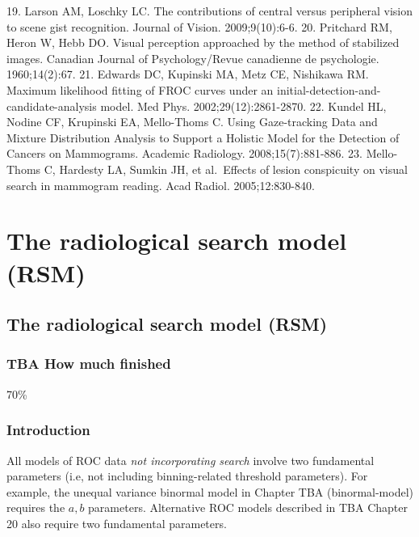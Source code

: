 \documentclass[
]{book}
\begin{document}
19. Larson AM, Loschky LC. The contributions of central versus peripheral vision to scene gist recognition. Journal of Vision. 2009;9(10):6-6.
20. Pritchard RM, Heron W, Hebb DO. Visual perception approached by the method of stabilized images. Canadian Journal of Psychology/Revue canadienne de psychologie. 1960;14(2):67.
21. Edwards DC, Kupinski MA, Metz CE, Nishikawa RM. Maximum likelihood fitting of FROC curves under an initial-detection-and-candidate-analysis model. Med Phys. 2002;29(12):2861-2870.
22. Kundel HL, Nodine CF, Krupinski EA, Mello-Thoms C. Using Gaze-tracking Data and Mixture Distribution Analysis to Support a Holistic Model for the Detection of Cancers on Mammograms. Academic Radiology. 2008;15(7):881-886.
23. Mello-Thoms C, Hardesty LA, Sumkin JH, et al.~Effects of lesion conspicuity on visual search in mammogram reading. Acad Radiol. 2005;12:830-840.

\hypertarget{part-the-radiological-search-model-rsm}{%
\part*{The radiological search model (RSM)}\label{part-the-radiological-search-model-rsm}}

\hypertarget{rsm}{%
\chapter{The radiological search model (RSM)}\label{rsm}}

\hypertarget{rsm-how-much-finished}{%
\section{TBA How much finished}\label{rsm-how-much-finished}}

70\%

\hypertarget{rsm-intro}{%
\section{Introduction}\label{rsm-intro}}

All models of ROC data \emph{not incorporating search} involve two fundamental parameters (i.e, not including binning-related threshold parameters). For example, the unequal variance binormal model in Chapter TBA (binormal-model) requires the \(a,b\) parameters. Alternative ROC models described in TBA Chapter 20 also require two fundamental parameters.
\end{document}
